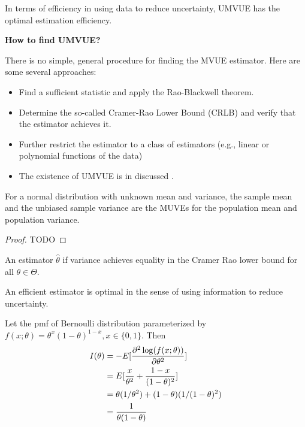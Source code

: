 \begin{refsection}
\begin{remark} [interpretation]
	In terms of efficiency in using data to reduce uncertainty, UMVUE has the optimal estimation efficiency.
\end{remark}

\begin{mdframed}
	\textbf{How to find UMVUE?}
	
	There is no simple, general procedure for finding the MVUE
	estimator. Here are some several
	approaches:
	\begin{itemize}
		\item Find a sufficient statistic and apply the Rao-Blackwell theorem.
		\item Determine the so-called Cramer-Rao Lower Bound (CRLB)
		and verify that the estimator achieves it.
		\item Further restrict the estimator to a class of estimators (e.g.,
		linear or polynomial functions of the data)
		\item The existence of UMVUE is in discussed \cite[62]{keener2010theoretical}.
	\end{itemize}
\end{mdframed}



\begin{lemma}
	For a normal distribution with unknown mean and variance, the sample mean and the unbiased sample variance are the MUVEs for the population mean and population variance.
\end{lemma}
\begin{proof}
	TODO
	
\end{proof}




\begin{definition}
	An estimator $\hat{\theta}$ if variance achieves equality in the Cramer Rao lower bound for all $\theta\in \Theta$.
\end{definition}

\begin{remark}
	An efficient estimator is optimal in the sense of using information to reduce uncertainty.
\end{remark}

\begin{example}
	Let the pmf of Bernoulli distribution parameterized by $f(x;\theta) = \theta^x(1-\theta)^{1-x},x\in\{0,1\}$. Then
	\begin{align*}
	I(\theta) &= -E[\frac{\partial^2 \log(f(x;\theta))}{\partial \theta^2}] \\
	&= E[\frac{x}{\theta^2} + \frac{1-x}{(1-\theta)^2}]\\
	&= \theta (1/\theta^2) + (1-\theta)(1/(1-\theta)^2) \\
	&= \frac{1}{\theta(1-\theta)}
	\end{align*}
	

\end{example}
\end{refsection}
